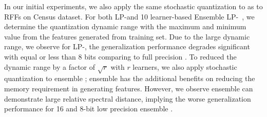 In our initial experiments, we also apply the same stochastic quantization to \Nystrom as to RFFs on Census dataset. For both LP-\Nystrom and 10 learner-based Ensemble LP-\Nystrom~\cite{ensemble09}, we determine the quantization dynamic range with the maximum and minimum value from the \Nystrom features generated from training set. Due to the large dynamic range, we observe for LP-\Nystrom, the generalization performance degrades significant with equal or less than 8 bits comparing to full precision \Nystrom. To reduced the dynamic range by a factor of $\sqrt{r}$ with $r$ learners, we also apply stochastic quantization to ensemble \Nystrom; ensemble \Nystrom has the additional benefits on reducing the memory requirement in generating \Nystrom features. However, we observe ensemble \Nystrom can demonstrate large relative spectral distance, implying the worse generalization performance for 16 and 8-bit low precision ensemble \Nystrom. 




